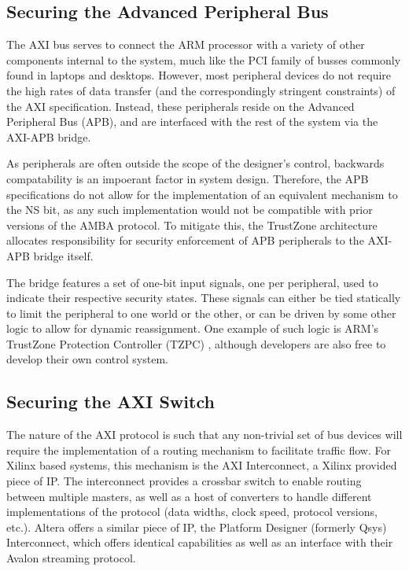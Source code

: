 \documentclass[journal]{IEEEtran}
\begin{document}
\subsection{Securing the Advanced Peripheral Bus}
The AXI bus serves to connect the ARM processor with a variety of other components
internal to the system, much like the PCI family of busses commonly found in laptops and
desktops. However, most peripheral devices do not require the high rates of data transfer
(and the correspondingly stringent constraints) of the AXI specification. Instead, these
peripherals reside on the Advanced Peripheral Bus (APB), and are interfaced with the rest
of the system via the AXI-APB bridge.\cite{noauthor_arm_nodate}

As peripherals are often outside the scope of the designer's control, backwards
compatability is an impoerant factor in system design. Therefore, the APB specifications
do not allow for the implementation of an equivalent mechanism to the NS bit, as any such
implementation would not be compatible with prior versions of the AMBA protocol. To 
mitigate this, the TrustZone architecture allocates responsibility for security
enforcement of APB peripherals to the AXI-APB bridge itself.

The bridge features a set of one-bit input signals, one per peripheral, used to indicate
their respective security states. These signals can either be tied statically to limit
the peripheral to one world or the other, or can be driven by some other logic to allow
for dynamic reassignment. One example of such logic is ARM's TrustZone Protection 
Controller (TZPC) \cite{noauthor_arm_nodate}, although developers are also free to develop
their own control system.

\subsection{Securing the AXI Switch}
The nature of the AXI protocol is such that any non-trivial set of bus devices will
require the implementation of a routing mechanism to facilitate traffic flow. For Xilinx
based systems, this mechanism is the AXI Interconnect, a Xilinx provided piece of IP. 
\cite{noauthor_axi_2017} The interconnect provides a crossbar switch to enable routing 
between multiple masters, as well as a host of converters to handle different 
implementations of the protocol (data widths, clock speed, protocol versions, etc.). 
Altera offers a similar piece of IP, the Platform Designer (formerly Qsys) Interconnect,
which offers identical capabilities as well as an interface with their Avalon streaming
protocol. \cite{noauthor_intel_nodate}
\end{document}
